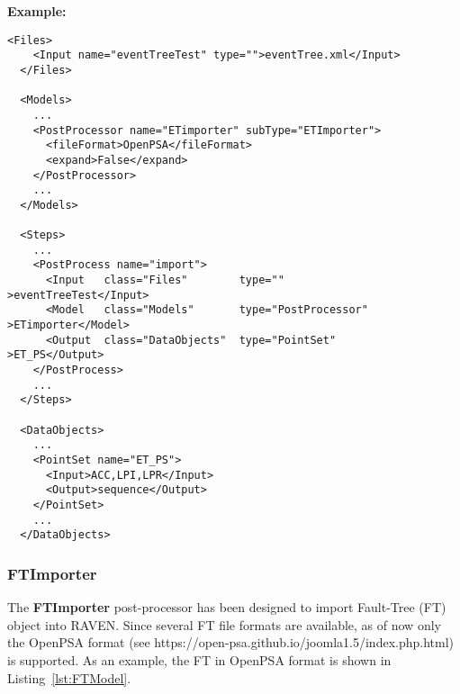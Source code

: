 \textbf{Example:}
\begin{lstlisting}[style=XML,morekeywords={anAttribute},caption=ET Importer input example., label=lst:ET_PP_InputExample]
  <Files>
    <Input name="eventTreeTest" type="">eventTree.xml</Input>
  </Files>

  <Models>
    ...
    <PostProcessor name="ETimporter" subType="ETImporter">
      <fileFormat>OpenPSA</fileFormat>
      <expand>False</expand>
    </PostProcessor>
    ...
  </Models>

  <Steps>
    ...
    <PostProcess name="import">
      <Input   class="Files"        type=""                >eventTreeTest</Input>
      <Model   class="Models"       type="PostProcessor"   >ETimporter</Model>
      <Output  class="DataObjects"  type="PointSet"        >ET_PS</Output>
    </PostProcess>
    ...
  </Steps>

  <DataObjects>
    ...
    <PointSet name="ET_PS">
      <Input>ACC,LPI,LPR</Input>
      <Output>sequence</Output>
    </PointSet>
    ...
  </DataObjects>
\end{lstlisting}



\subsubsection{FTImporter}
\label{FTImporterPP}
The \textbf{FTImporter} post-processor has been designed to import Fault-Tree (FT) object into
RAVEN. Since several FT file formats are available, as of now only the OpenPSA format
(see https://open-psa.github.io/joomla1.5/index.php.html) is supported. As an example,
the FT in OpenPSA format is shown in Listing~\ref{lst:FTModel}.

